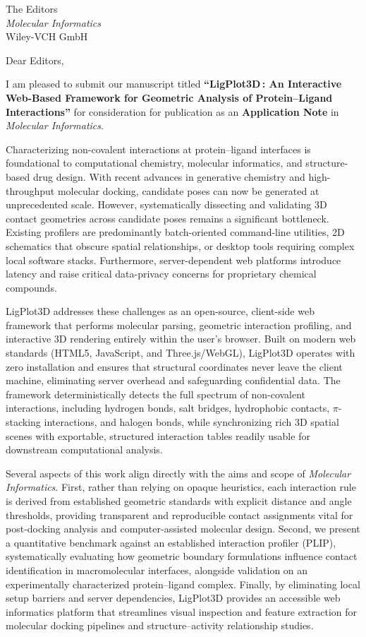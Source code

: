 \documentclass[11pt]{letter}
\date{\today}
\begin{document}
\begin{letter}{The Editors\\
\textit{Molecular Informatics}\\
Wiley-VCH GmbH}

\opening{Dear Editors,}

I am pleased to submit our manuscript titled \textbf{``LigPlot3D\,: An Interactive Web-Based Framework for Geometric Analysis of Protein--Ligand Interactions''} for consideration for publication as an \textbf{Application Note} in \textit{Molecular Informatics}.

Characterizing non-covalent interactions at protein--ligand interfaces is foundational to computational chemistry, molecular informatics, and structure-based drug design. With recent advances in generative chemistry and high-throughput molecular docking, candidate poses can now be generated at unprecedented scale. However, systematically dissecting and validating 3D contact geometries across candidate poses remains a significant bottleneck. Existing profilers are predominantly batch-oriented command-line utilities, 2D schematics that obscure spatial relationships, or desktop tools requiring complex local software stacks. Furthermore, server-dependent web platforms introduce latency and raise critical data-privacy concerns for proprietary chemical compounds.

LigPlot3D addresses these challenges as an open-source, client-side web framework that performs molecular parsing, geometric interaction profiling, and interactive 3D rendering entirely within the user's browser. Built on modern web standards (HTML5, JavaScript, and Three.js/WebGL), LigPlot3D operates with zero installation and ensures that structural coordinates never leave the client machine, eliminating server overhead and safeguarding confidential data. The framework deterministically detects the full spectrum of non-covalent interactions, including hydrogen bonds, salt bridges, hydrophobic contacts, $\pi$-stacking interactions, and halogen bonds, while synchronizing rich 3D spatial scenes with exportable, structured interaction tables readily usable for downstream computational analysis.

Several aspects of this work align directly with the aims and scope of \textit{Molecular Informatics}. First, rather than relying on opaque heuristics, each interaction rule is derived from established geometric standards with explicit distance and angle thresholds, providing transparent and reproducible contact assignments vital for post-docking analysis and computer-assisted molecular design. Second, we present a quantitative benchmark against an established interaction profiler (PLIP), systematically evaluating how geometric boundary formulations influence contact identification in macromolecular interfaces, alongside validation on an experimentally characterized protein--ligand complex. Finally, by eliminating local setup barriers and server dependencies, LigPlot3D provides an accessible web informatics platform that streamlines visual inspection and feature extraction for molecular docking pipelines and structure--activity relationship studies.


\end{letter}
\end{document}
